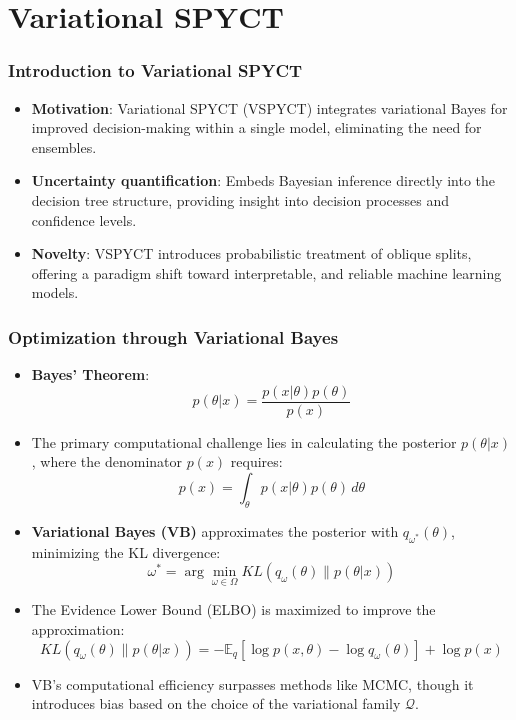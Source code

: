 \documentclass{beamer}
\begin{document}
\section{Variational SPYCT}
\begin{frame}
  \frametitle{Introduction to Variational SPYCT}
  \begin{itemize}
    \item \textbf{Motivation}: Variational SPYCT (VSPYCT) integrates variational Bayes for improved decision-making within a single model, eliminating the need for ensembles.
    \item \textbf{Uncertainty quantification}: Embeds Bayesian inference directly into the decision tree structure, providing insight into decision processes and confidence levels.
    \item \textbf{Novelty}: VSPYCT introduces probabilistic treatment of oblique splits, offering a paradigm shift toward interpretable, and reliable machine learning models.
  \end{itemize}
  
\end{frame}


\begin{frame}
  \frametitle{Optimization through Variational Bayes}
  
  \small %
  
  \begin{itemize}
    \item \textbf{Bayes' Theorem}: 
      \[
      p(\theta|x) = \frac{p(x|\theta) p(\theta)}{p(x)}
      \]
    \item The primary computational challenge lies in calculating the posterior $p(\theta|x)$, where the denominator $p(x)$ requires:
      \[
      p(x) = \int_{\theta} p(x|\theta) p(\theta) \,d\theta
      \]
    \item \textbf{Variational Bayes (VB)} approximates the posterior with $q_{\omega^*}(\theta)$, minimizing the KL divergence:
      \[
      \omega^* = \arg\min_{\omega \in \Omega} KL(q_\omega(\theta) \parallel p(\theta|x))
      \]
    \item The Evidence Lower Bound (ELBO) is maximized to improve the approximation:
      \[
      KL(q_\omega(\theta) \parallel p(\theta|x)) = - \mathbb{E}_q[\log p(x,\theta) - \log q_\omega(\theta)] + \log p(x)
      \]
    \item VB's computational efficiency surpasses methods like MCMC, though it introduces bias based on the choice of the variational family $\mathcal{Q}$.
  \end{itemize}
  
\end{frame}
\end{document}
